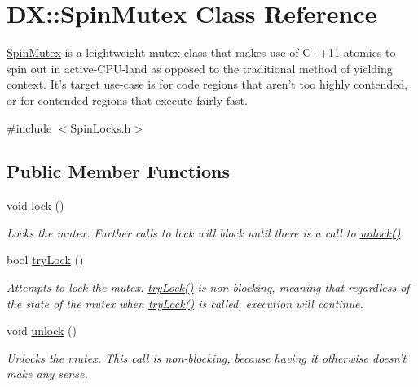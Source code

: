\hypertarget{class_d_x_1_1_spin_mutex}{\section{D\-X\-:\-:Spin\-Mutex Class Reference}
\label{class_d_x_1_1_spin_mutex}
}


\hyperlink{class_d_x_1_1_spin_mutex}{Spin\-Mutex} is a leightweight mutex class that makes use of C++11 atomics to spin out in active-\/\-C\-P\-U-\/land as opposed to the traditional method of yielding context. It's target use-\/case is for code regions that aren't too highly contended, or for contended regions that execute fairly fast.  




{\ttfamily \#include $<$Spin\-Locks.\-h$>$}

\subsection*{Public Member Functions}
\begin{DoxyCompactItemize}
\item 
void \hyperlink{class_d_x_1_1_spin_mutex_ad550ac8a2a96dbc0e53bb52c58c4a2e9}{lock} ()
\begin{DoxyCompactList}\small\item\em Locks the mutex. Further calls to lock will block until there is a call to \hyperlink{class_d_x_1_1_spin_mutex_a5c4d4863862540c18c007501d87168d6}{unlock()}. \end{DoxyCompactList}\item 
bool \hyperlink{class_d_x_1_1_spin_mutex_a5c1345257b4b39051d93d59460005cfc}{try\-Lock} ()
\begin{DoxyCompactList}\small\item\em Attempts to lock the mutex. \hyperlink{class_d_x_1_1_spin_mutex_a5c1345257b4b39051d93d59460005cfc}{try\-Lock()} is non-\/blocking, meaning that regardless of the state of the mutex when \hyperlink{class_d_x_1_1_spin_mutex_a5c1345257b4b39051d93d59460005cfc}{try\-Lock()} is called, execution will continue. \end{DoxyCompactList}\item 
\hypertarget{class_d_x_1_1_spin_mutex_a5c4d4863862540c18c007501d87168d6}{void \hyperlink{class_d_x_1_1_spin_mutex_a5c4d4863862540c18c007501d87168d6}{unlock} ()}\label{class_d_x_1_1_spin_mutex_a5c4d4863862540c18c007501d87168d6}

\begin{DoxyCompactList}\small\item\em Unlocks the mutex. This call is non-\/blocking, because having it otherwise doesn't make any sense. \end{DoxyCompactList}\end{DoxyCompactItemize}


